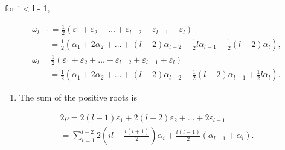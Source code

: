 for i \textless{} l - 1,

\[
\begin{array}{l} \omega_ {l - 1} = \frac {1}{2} (\varepsilon_ {1} + \varepsilon_ {2} + \dots + \varepsilon_ {l - 2} + \varepsilon_ {l - 1} - \varepsilon_ {l}) \\ \qquad = \frac {1}{2} (\alpha_ {1} + 2 \alpha_ {2} + \dots + (l - 2) \alpha_ {l - 2} + \frac {1}{2} l \alpha_ {l - 1} + \frac {1}{2} (l - 2) \alpha_ {l}), \\ \omega_ {l} = \frac {1}{2} (\varepsilon_ {1} + \varepsilon_ {2} + \dots + \varepsilon_ {l - 2} + \varepsilon_ {l - 1} + \varepsilon_ {l}) \\ \qquad = \frac {1}{2} (\alpha_ {1} + 2 \alpha_ {2} + \dots + (l - 2) \alpha_ {l - 2} + \frac {1}{2} (l - 2) \alpha_ {l - 1} + \frac {1}{2} l \alpha_ {l}). \end{array}
\]

\begin{enumerate}
\def\labelenumi{(\Roman{enumi})}
\setcounter{enumi}{6}
\tightlist
\item
  The sum of the positive roots is
\end{enumerate}

\[
\begin{array}{l} 2 \rho = 2 (l - 1) \varepsilon_ {1} + 2 (l - 2) \varepsilon_ {2} + \dots + 2 \varepsilon_ {l - 1} \\ = \sum_ {i = 1} ^ {l - 2} 2 (i l - \frac {i (i + 1)}{2}) \alpha_ {i} + \frac {l (l - 1)}{2} (\alpha_ {l - 1} + \alpha_ {l}). \end{array}
\]

